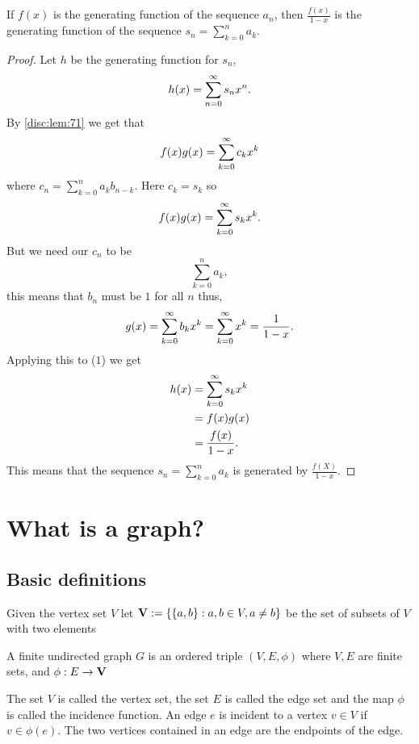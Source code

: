 \documentclass[10pt, a4paper]{article}
\begin{document}
\begin{theorem}
    If $f(x)$ is the generating function of the sequence $a_n$,
    then $\frac{f(x)}{1 - x}$ is the generating function of the sequence $s_n = \sum_{k = 0}^{n}a_k$.
    \begin{proof}
        Let $h$ be the generating function for $s_n$,
        \[
        h(x) = \infsum[n = 0]s_nx ^ n.
        \]
        By \autoref{disc:lem:71} we get that
        \[
        f(x)g(x) = \infsum[k = 0]c_kx ^ k
        \]
        where $c_n = \sum_{k = 0}^{n}a_{k}b_{n - k}$.
        Here $c_k = s_k$ so
        \begin{equation}
            f(x)g(x) = \infsum[k = 0]s_kx ^ k.
        \end{equation}
        But we need our $c_n$ to be
        \[
        \sum_{k = 0}^{n}a_k,
        \]
        this means that $b_n$ must be $1$ for all $n$ thus,
        \[
        g(x) = \infsum[k = 0]b_kx ^ k = \infsum[k = 0]x ^ k = \frac{1}{1 - x}.
        \]
        Applying this to ($1$) we get
        \begin{align*}
            h(x) &= \infsum[k = 0]s_kx ^ k \\
            &= f(x)g(x) \\
            &= \frac{f(x)}{1 - x}.
        \end{align*}
        This means that the sequence $s_n = \sum_{k = 0}^{n}a_k$ is generated by $\frac{f(X)}{1 - x}$.
    \end{proof}
\end{theorem}

\newpage

\section{What is a graph?}

\subsection{Basic definitions}

Given the vertex set $V$ let $\mbf{V} := \{\{a, b\} : a, b \in V, a \neq b\}$ be the set of subsets of $V$ with two elements
\begin{definition}
    A finite undirected graph $G$ is an ordered triple $(V, E, \phi)$ where $V, E$ are finite sets,
    and $\phi : E \rightarrow \mbf{V}$
\end{definition}

The set $V$ is called the vertex set,
the set $E$ is called the edge set and the map $\phi$ is called the incidence function.
An edge $e$ is incident to a vertex $v \in V$ if $v \in \phi(e)$.
The two vertices contained in an edge are the endpoints of the edge.
\end{document}
